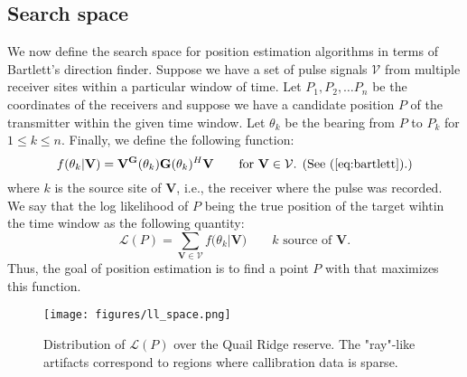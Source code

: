 \documentclass[letter]{article}
\begin{document}
  \subsection{Search space} 
We now define the search space for position estimation algorithms in terms of Bartlett's 
direction finder. Suppose we have a set of pulse signals $\mathcal{V}$ from multiple receiver 
sites within a particular window of time. Let $P_1, P_2, \dots P_n$ be the coordinates of the 
receivers and suppose we have a candidate position $P$ of the transmitter within the given 
time window. Let $\theta_k$ be the bearing from $P$ to $P_k$ for $1 \le k \le n$. Finally, 
we define the following function: 
\begin{equation*}
  f(\theta_k | \mathbf{V}) = 
    \mathbf{V}^\mathbf{G}(\theta_k)\mathbf{G}(\theta_k)^H\mathbf{V} 
  \qquad \text{for $\mathbf{V} \in \mathcal{V}$. (See (\ref{eq:bartlett}).)}
\end{equation*}
where $k$ is the source site of $\mathbf{V}$, i.e., the receiver where the pulse was recorded.
We say that the log likelihood of $P$ being the true position of the target wihtin the time 
window as the following quantity: 
\begin{equation}
  \mathcal{L}(P) = \sum_{\mathbf{V} \in \mathcal{V}}{f(\theta_k | \mathbf{V}}) 
  \qquad \text{$k$ source of $\mathbf{V}$.}
\end{equation}
Thus, the goal of position estimation is to find a point $P$ with that maximizes this 
function. 

\pagebreak
\begin{figure}
  \vspace{-60pt}
  \begin{center}
    \texttt{[image: figures/ll\_space.png]}
  \end{center}
  \caption{Distribution of $\mathcal{L}(P)$ over the Quail Ridge reserve. 
   The "ray"-like artifacts correspond to regions where callibration data 
   is sparse.}
  \vspace{-10pt}
\end{figure}
\end{document}
